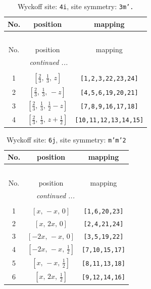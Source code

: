 \documentclass[fleqn,8pt]{jsarticle}
\begin{document}
\renewcommand{\arraystretch}{1.2}
\begin{longtable}{ccc}
\caption{Wyckoff site: {\tt 4i}, site symmetry: {\tt 3m'.}}
 \\
 \hline \hline
No. & position & mapping \\ \hline \endfirsthead

\multicolumn{2}{l}{\tablename\ \thetable{}} \\
 \hline \hline
No. & position & mapping \\ \hline \endhead

 \hline \hline
\multicolumn{2}{r}{\footnotesize\it continued ...} \\ \endfoot

 \hline \hline
\multicolumn{2}{r}{} \\ \endlastfoot

1 & $\left[ \frac{2}{3},\, \frac{1}{3},\, z \right]$ & {\tt [1,2,3,22,23,24]} \\ \hline
2 & $\left[ \frac{2}{3},\, \frac{1}{3},\, - z \right]$ & {\tt [4,5,6,19,20,21]} \\ \hline
3 & $\left[ \frac{2}{3},\, \frac{1}{3},\, \frac{1}{2} - z \right]$ & {\tt [7,8,9,16,17,18]} \\ \hline
4 & $\left[ \frac{2}{3},\, \frac{1}{3},\, z + \frac{1}{2} \right]$ & {\tt [10,11,12,13,14,15]} \\
\end{longtable}
\renewcommand{\arraystretch}{1.2}
\begin{longtable}{ccc}
\caption{Wyckoff site: {\tt 6j}, site symmetry: {\tt m'm'2}}
 \\
 \hline \hline
No. & position & mapping \\ \hline \endfirsthead

\multicolumn{2}{l}{\tablename\ \thetable{}} \\
 \hline \hline
No. & position & mapping \\ \hline \endhead

 \hline \hline
\multicolumn{2}{r}{\footnotesize\it continued ...} \\ \endfoot

 \hline \hline
\multicolumn{2}{r}{} \\ \endlastfoot

1 & $\left[ x,\, - x,\, 0 \right]$ & {\tt [1,6,20,23]} \\ \hline
2 & $\left[ x,\, 2 x,\, 0 \right]$ & {\tt [2,4,21,24]} \\ \hline
3 & $\left[ - 2 x,\, - x,\, 0 \right]$ & {\tt [3,5,19,22]} \\ \hline
4 & $\left[ - 2 x,\, - x,\, \frac{1}{2} \right]$ & {\tt [7,10,15,17]} \\ \hline
5 & $\left[ x,\, - x,\, \frac{1}{2} \right]$ & {\tt [8,11,13,18]} \\ \hline
6 & $\left[ x,\, 2 x,\, \frac{1}{2} \right]$ & {\tt [9,12,14,16]} \\
\end{longtable}
\end{document}
